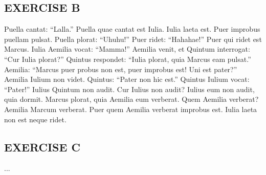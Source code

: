 \subsection*{EXERCISE B}
Puella cantat: ``Lalla.'' Puella quae cantat est Iulia. Iulia laeta est. Puer improbus puellam pulsat. Puella plorat: ``Uhuhu!'' Puer ridet: ``Hahahae!'' Puer qui ridet est Marcus. Iulia Aemilia vocat: ``Mamma!'' Aemilia venit, et Quintum interrogat: ``Cur Iulia plorat?'' Quintus respondet: ``Iulia plorat, quia Marcus eam pulsat.'' Aemilia: ``Marcus puer probus non est, puer improbus est! Uni est pater?'' Aemilia Iulium non videt. Quintus: ``Pater non hic est.'' Quintus Iulium vocat: ``Pater!'' Iulius Quintum non audit. Cur Iulius non audit? Iulius eum non audit, quia dormit. Marcus plorat, quia Aemilia eum verberat. Quem Aemilia verberat? Aemilia Marcum verberat. Puer quem Aemilia verberat improbus est. Iulia laeta non est neque ridet.

\subsection*{EXERCISE C}
...

